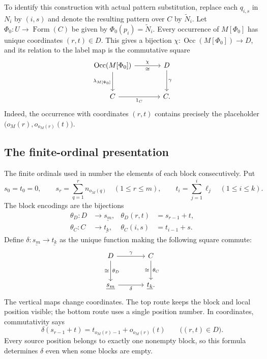 \documentclass[11pt]{article}
\newcommand{\Occ}{\operatorname{Occ}}
\newcommand{\FormulaSet}{\operatorname{Form}}
\begin{document}
To identify this construction with actual pattern substitution,
replace each $q_{i,s}$ in $N_i$ by $(i,s)$ and denote the resulting
pattern over $C$ by $\widetilde N_i$. Let
$\Phi_0:U\to\FormulaSet(C)$ be given by $\Phi_0(p_i)=\widetilde N_i$.
Every occurrence of $M[\Phi_0]$ has unique coordinates $(r,t)\in D$.
This gives a bijection $\chi:\Occ(M[\Phi_0])\to D$, and its relation
to the label map is the commutative square
\begin{equation}\label{eq:app-occurrence-labels}
\begin{tikzcd}[column sep=large,row sep=large]
 \Occ(M[\Phi_0])\arrow[r,"\chi","\cong"']
    \arrow[d,"\lambda_{M[\Phi_0]}"']&D\arrow[d,"\gamma"]\\
 C\arrow[r,"1_C"']&C.
\end{tikzcd}
\end{equation}
Indeed, the occurrence with coordinates $(r,t)$ contains precisely
the placeholder $\bigl(o_M(r),o_{o_M(r)}(t)\bigr)$.

\subsection{The finite-ordinal presentation}\label{app:ordinals}

The finite ordinals used in \cite{DP} number the elements of each
block consecutively. Put
\[
 s_0=t_0=0,\qquad
 s_r=\sum_{q=1}^{r}n_{o_M(q)}\quad(1\leq r\leq m),\qquad
 t_i=\sum_{j=1}^{i}\ell_j\quad(1\leq i\leq k).
\]
The block encodings are the bijections
\[
 \begin{aligned}
 \theta_D:D&\longrightarrow\underline{s_m},
       &\theta_D(r,t)&=s_{r-1}+t,\\
 \theta_C:C&\longrightarrow\underline{t_k},
       &\theta_C(i,s)&=t_{i-1}+s.
 \end{aligned}
\]
Define $\delta:\underline{s_m}\to\underline{t_k}$ as the unique
function making the following square commute:
\begin{equation}\label{eq:app-ordinal}
\begin{tikzcd}[column sep=large,row sep=large]
 D\arrow[r,"\gamma"]\arrow[d,"\theta_D","\cong"']
    &C\arrow[d,"\theta_C","\cong"']\\
 \underline{s_m}\arrow[r,"\delta"']&\underline{t_k}.
\end{tikzcd}
\end{equation}
The vertical maps change coordinates. The top route keeps the block
and local position visible; the bottom route uses a single position
number. In coordinates, commutativity says
\begin{equation}\label{eq:app-coordinate}
 \delta(s_{r-1}+t)=t_{o_M(r)-1}+o_{o_M(r)}(t)
 \qquad\bigl((r,t)\in D\bigr).
\end{equation}
Every source position belongs to exactly one nonempty block, so this
formula determines $\delta$ even when some blocks are empty.
\end{document}
